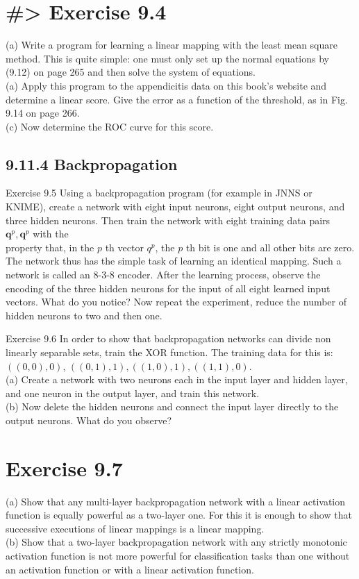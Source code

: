 \documentclass[10pt]{article}
\begin{document}
\section*{\#> Exercise 9.4}
(a) Write a program for learning a linear mapping with the least mean square method. This is quite simple: one must only set up the normal equations by (9.12) on page 265 and then solve the system of equations.\\
(a) Apply this program to the appendicitis data on this book's website and determine a linear score. Give the error as a function of the threshold, as in Fig. 9.14 on page 266.\\
(c) Now determine the ROC curve for this score.

\subsection*{9.11.4 Backpropagation}
Exercise 9.5 Using a backpropagation program (for example in JNNS or KNIME), create a network with eight input neurons, eight output neurons, and three hidden neurons. Then train the network with eight training data pairs $\boldsymbol{q}^{p}, \boldsymbol{q}^{p}$ with the\\
property that, in the $p$ th vector $q^{p}$, the $p$ th bit is one and all other bits are zero. The network thus has the simple task of learning an identical mapping. Such a network is called an 8-3-8 encoder. After the learning process, observe the encoding of the three hidden neurons for the input of all eight learned input vectors. What do you notice? Now repeat the experiment, reduce the number of hidden neurons to two and then one.


Exercise 9.6 In order to show that backpropagation networks can divide non linearly separable sets, train the XOR function. The training data for this is: $((0,0), 0)$, $((0,1), 1),((1,0), 1),((1,1), 0)$.\\
(a) Create a network with two neurons each in the input layer and hidden layer, and one neuron in the output layer, and train this network.\\
(b) Now delete the hidden neurons and connect the input layer directly to the output neurons. What do you observe?

\section*{Exercise 9.7}
(a) Show that any multi-layer backpropagation network with a linear activation function is equally powerful as a two-layer one. For this it is enough to show that successive executions of linear mappings is a linear mapping.\\
(b) Show that a two-layer backpropagation network with any strictly monotonic activation function is not more powerful for classification tasks than one without an activation function or with a linear activation function.
\end{document}
